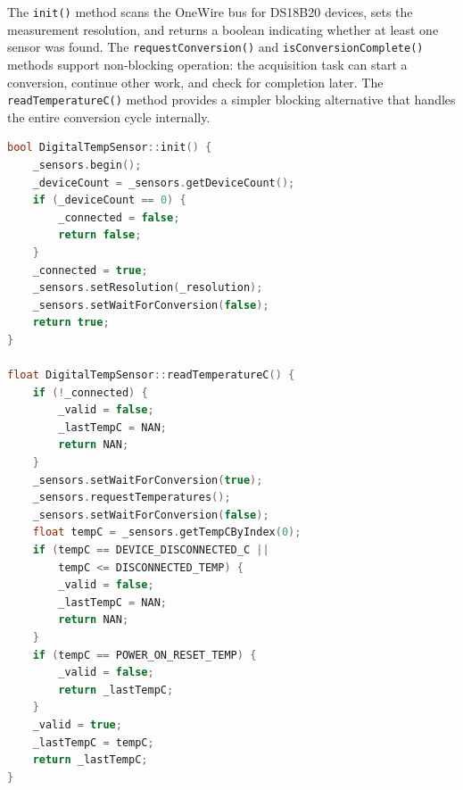 The \texttt{init()} method scans the OneWire bus for DS18B20 devices, sets the measurement resolution, and returns a boolean indicating whether at least one sensor was found. The \texttt{requestConversion()} and \texttt{isConversionComplete()} methods support non-blocking operation: the acquisition task can start a conversion, continue other work, and check for completion later. The \texttt{readTemperatureC()} method provides a simpler blocking alternative that handles the entire conversion cycle internally.

\begin{lstlisting}[language=C++, caption=Key implementation --- DS18B20 initialization and reading, label=lst:digital_sensor_impl]
bool DigitalTempSensor::init() {
    _sensors.begin();
    _deviceCount = _sensors.getDeviceCount();
    if (_deviceCount == 0) {
        _connected = false;
        return false;
    }
    _connected = true;
    _sensors.setResolution(_resolution);
    _sensors.setWaitForConversion(false);
    return true;
}

float DigitalTempSensor::readTemperatureC() {
    if (!_connected) {
        _valid = false;
        _lastTempC = NAN;
        return NAN;
    }
    _sensors.setWaitForConversion(true);
    _sensors.requestTemperatures();
    _sensors.setWaitForConversion(false);
    float tempC = _sensors.getTempCByIndex(0);
    if (tempC == DEVICE_DISCONNECTED_C ||
        tempC <= DISCONNECTED_TEMP) {
        _valid = false;
        _lastTempC = NAN;
        return NAN;
    }
    if (tempC == POWER_ON_RESET_TEMP) {
        _valid = false;
        return _lastTempC;
    }
    _valid = true;
    _lastTempC = tempC;
    return _lastTempC;
}
\end{lstlisting}

